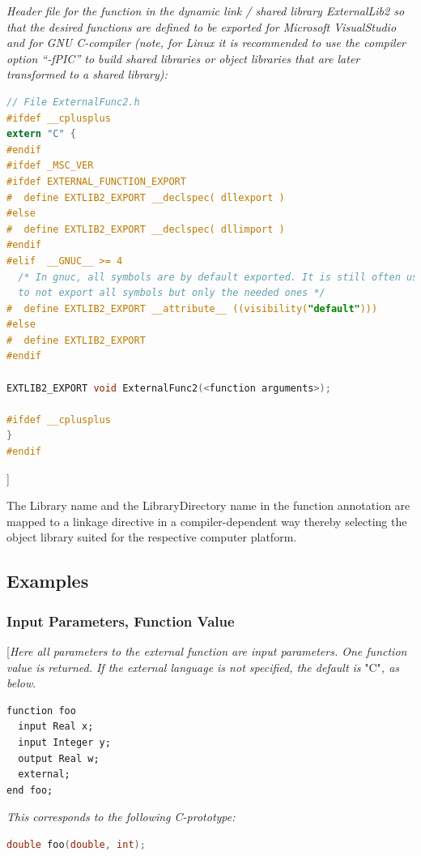 \documentclass[10pt,a4paper]{report}
\def\doublelabel#1{\label{#1}}
\begin{document}
\emph{Header file for the function in the dynamic link / shared library
ExternalLib2 so that the desired functions are defined to be exported
for Microsoft VisualStudio and for GNU C-compiler (note, for Linux it is
recommended to use the compiler option ``-fPIC'' to build shared
libraries or object libraries that are later transformed to a shared
library):}

\begin{lstlisting}[language=C]
// File ExternalFunc2.h 
#ifdef __cplusplus 
extern "C" { 
#endif 
#ifdef _MSC_VER 
#ifdef EXTERNAL_FUNCTION_EXPORT 
#  define EXTLIB2_EXPORT __declspec( dllexport ) 
#else  
#  define EXTLIB2_EXPORT __declspec( dllimport ) 
#endif 
#elif  __GNUC__ >= 4     
  /* In gnuc, all symbols are by default exported. It is still often useful,         
  to not export all symbols but only the needed ones */ 
#  define EXTLIB2_EXPORT __attribute__ ((visibility("default"))) 
#else 
#  define EXTLIB2_EXPORT 
#endif

EXTLIB2_EXPORT void ExternalFunc2(<function arguments>); 

#ifdef __cplusplus 
} 
#endif
\end{lstlisting}
{]}

The Library name and the LibraryDirectory name in the function
annotation are mapped to a linkage directive in a compiler-dependent way
thereby selecting the object library suited for the respective computer
platform.

\subsection{Examples}\doublelabel{examples1}

\subsubsection{Input Parameters, Function Value}\doublelabel{input-parameters-function-value}

{[}\emph{Here all parameters to the external function are input
parameters. One function value is returned. If the external language is
not specified, the default is} "C"\emph{, as below}.

\begin{lstlisting}[language=modelica]
function foo
  input Real x;
  input Integer y;
  output Real w;
  external;
end foo;
\end{lstlisting}
\emph{This corresponds to the following C-prototype:}
\begin{lstlisting}[language=C]
double foo(double, int);
\end{lstlisting}
\end{document}
